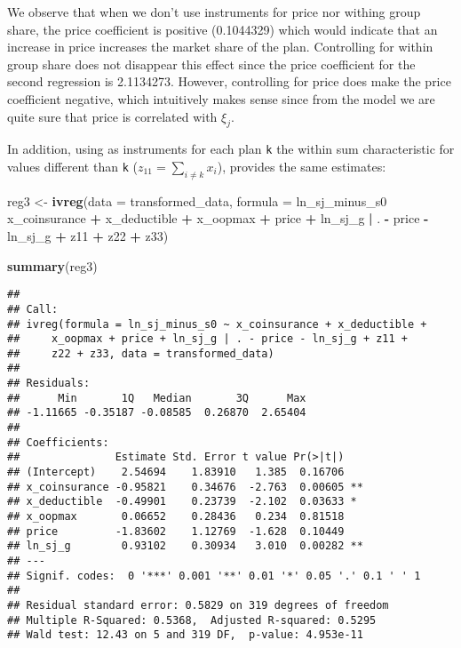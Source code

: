 \documentclass[]{article}
\newenvironment{Shaded}{\begin{snugshade}}{\end{snugshade}}
\newcommand{\DataTypeTok}[1]{\textcolor[rgb]{0.13,0.29,0.53}{#1}}
\newcommand{\KeywordTok}[1]{\textcolor[rgb]{0.13,0.29,0.53}{\textbf{#1}}}
\newcommand{\NormalTok}[1]{#1}
\newcommand{\OperatorTok}[1]{\textcolor[rgb]{0.81,0.36,0.00}{\textbf{#1}}}
\newcommand{\StringTok}[1]{\textcolor[rgb]{0.31,0.60,0.02}{#1}}
\begin{document}
We observe that when we don't use instruments for price nor withing
group share, the price coefficient is positive (0.1044329) which would
indicate that an increase in price increases the market share of the
plan. Controlling for within group share does not disappear this effect
since the price coefficient for the second regression is 2.1134273.
However, controlling for price does make the price coefficient negative,
which intuitively makes sense since from the model we are quite sure
that price is correlated with \(\xi_j\).

In addition, using as instruments for each plan \texttt{k} the within
sum characteristic for values different than \texttt{k}
(\(z_{11} = \sum_{i \neq k } x_{i}\)), provides the same estimates:

\begin{Shaded}
\begin{Highlighting}[]
\NormalTok{reg3 <-}\StringTok{ }\KeywordTok{ivreg}\NormalTok{(}\DataTypeTok{data =}\NormalTok{ transformed_data, }
      \DataTypeTok{formula =}\NormalTok{ ln_sj_minus_s0 }\OperatorTok{~}\StringTok{ }\NormalTok{x_coinsurance }\OperatorTok{+}\StringTok{ }\NormalTok{x_deductible }\OperatorTok{+}\StringTok{ }\NormalTok{x_oopmax }\OperatorTok{+}\StringTok{ }\NormalTok{price }\OperatorTok{+}\StringTok{ }\NormalTok{ln_sj_g }\OperatorTok{|}\StringTok{ }\NormalTok{. }\OperatorTok{-}\StringTok{ }\NormalTok{price }\OperatorTok{-}\StringTok{ }\NormalTok{ln_sj_g }\OperatorTok{+}\StringTok{ }\NormalTok{z11 }\OperatorTok{+}\StringTok{ }\NormalTok{z22 }\OperatorTok{+}\StringTok{ }\NormalTok{z33)}

\KeywordTok{summary}\NormalTok{(reg3)}
\end{Highlighting}
\end{Shaded}

\begin{verbatim}
## 
## Call:
## ivreg(formula = ln_sj_minus_s0 ~ x_coinsurance + x_deductible + 
##     x_oopmax + price + ln_sj_g | . - price - ln_sj_g + z11 + 
##     z22 + z33, data = transformed_data)
## 
## Residuals:
##      Min       1Q   Median       3Q      Max 
## -1.11665 -0.35187 -0.08585  0.26870  2.65404 
## 
## Coefficients:
##               Estimate Std. Error t value Pr(>|t|)   
## (Intercept)    2.54694    1.83910   1.385  0.16706   
## x_coinsurance -0.95821    0.34676  -2.763  0.00605 **
## x_deductible  -0.49901    0.23739  -2.102  0.03633 * 
## x_oopmax       0.06652    0.28436   0.234  0.81518   
## price         -1.83602    1.12769  -1.628  0.10449   
## ln_sj_g        0.93102    0.30934   3.010  0.00282 **
## ---
## Signif. codes:  0 '***' 0.001 '**' 0.01 '*' 0.05 '.' 0.1 ' ' 1
## 
## Residual standard error: 0.5829 on 319 degrees of freedom
## Multiple R-Squared: 0.5368,  Adjusted R-squared: 0.5295 
## Wald test: 12.43 on 5 and 319 DF,  p-value: 4.953e-11
\end{verbatim}
\end{document}
